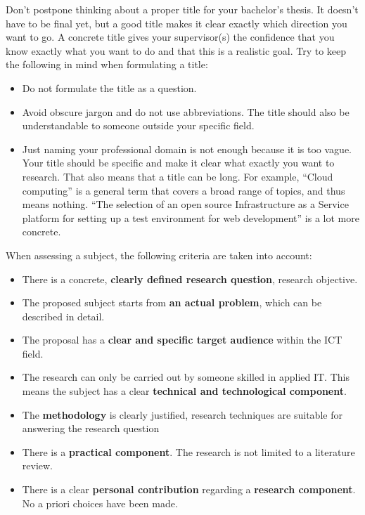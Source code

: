 Don't postpone thinking about a proper title for your bachelor's thesis. It doesn't have to be final yet, but a good title makes it clear exactly which direction you want to go. A concrete title gives your supervisor(s) the confidence that you know exactly what you want to do and that this is a realistic goal. Try to keep the following in mind when formulating a title:

\begin{itemize}
    \item Do not formulate the title as a question.
    \item Avoid obscure jargon and do not use abbreviations. The title should also be understandable to someone outside your specific field.
    \item Just naming your professional domain is not enough because it is too vague. Your title should be specific and make it clear what exactly you want to research. That also means that a title can be long. For example, ``Cloud computing'' is a general term that covers a broad range of topics, and thus means nothing. ``The selection of an open source Infrastructure as a Service platform for setting up a test environment for web development'' is a lot more concrete.  
\end{itemize}

When assessing a subject, the following criteria are taken into account:

\begin{itemize}
 \item There is a concrete, \textbf{clearly defined research question}, research objective.
 \item The proposed subject  starts from \textbf{an actual problem}, which can be described in detail.
 \item The proposal has a \textbf{clear and specific target audience} within the ICT field.
 \item The research can only be carried out by someone skilled in applied IT. This means the subject has a clear \textbf{technical and technological component}.
 \item The \textbf{methodology} is clearly justified, research techniques are suitable for answering the research question
 \item  There is a \textbf{practical component}. The research is not limited to a literature review.
 \item There is a clear \textbf{personal contribution} regarding a \textbf{research component}. No a priori choices have been made. 

\end{itemize}

